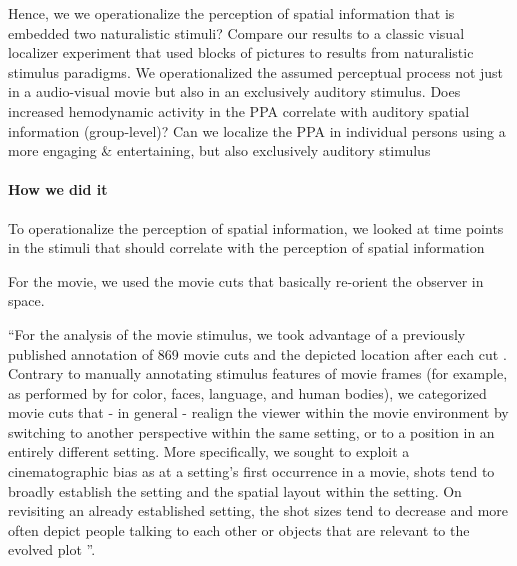
%
Hence, we we operationalize the perception of spatial information that is
embedded two naturalistic stimuli?
%
Compare our results to a classic visual localizer experiment that used blocks of
pictures to results from naturalistic stimulus paradigms.
%
We operationalized the assumed perceptual process not just in a
audio-visual movie but also in an exclusively auditory stimulus.
Does increased hemodynamic activity in the PPA correlate with auditory spatial
information (group-level)?
Can we localize the PPA in individual persons using a more engaging \&
entertaining, but also exclusively auditory stimulus

\paragraph{How we did it}



To operationalize the perception of spatial information, we looked at time
points in the stimuli that should correlate with the perception of spatial
information

%
For the movie, we used the movie cuts that basically re-orient the observer in
space.

``For the analysis of the movie stimulus, we took advantage of a previously
published annotation of 869 movie cuts and the depicted location after each cut
\citep{haeusler2016cutanno}.
Contrary to manually annotating stimulus features of movie frames (for example,
as performed by \citet{bartels2004mapping} for color, faces, language, and human
bodies), we categorized movie cuts that - in general - realign the viewer within
the movie environment by switching to another perspective within the same
setting, or to a position in an entirely different setting.
More specifically, we sought to exploit a cinematographic bias as
at a setting's first occurrence in a movie, shots tend to broadly establish the
setting and the spatial layout within the setting.
On revisiting an already established setting, the shot sizes tend to decrease
and more often depict people talking to each other or objects that are relevant
to the evolved plot
\citep{brown2012cinematography, katz1991film, mascelli1998five}''.

